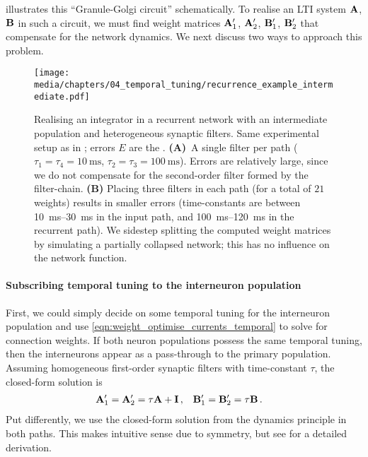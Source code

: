  illustrates this \enquote{Granule-Golgi circuit} schematically.
To realise an LTI system $\mathbf{A}$, $\mathbf{B}$ in such a circuit, we must find weight matrices $\mathbf{A}_1'$, $\mathbf{A}_2'$, $\mathbf{B}_1'$, $\mathbf{B}_2'$ that compensate for the network dynamics.
We next discuss two ways to approach this problem.

\begin{figure}
	\texttt{[image: media/chapters/04\_temporal\_tuning/recurrence\_example\_intermediate.pdf]}
	\caption[Realising an integrator in a recurrent network with an intermediate population]{Realising an integrator in a recurrent network with an intermediate population and heterogeneous synaptic filters. Same experimental setup as in ; errors $E$ are the \NRMSE.
	\textbf{(A)}~A single filter per path ($\tau_1 = \tau_4 = \SI{10}{\milli\second}$, $\tau_2 = \tau_3 = \SI{100}{\milli\second}$).
	Errors are relatively large, since we do not compensate for the second-order filter formed by the filter-chain.
	\textbf{(B)} Placing three filters in each path (for a total of $21$ weights) results in smaller errors (time-constants are between \SIrange{10}{30}{\milli\second} in the input path, and \SIrange{100}{120}{\milli\second} in the recurrent path).
	We sidestep splitting the computed weight matrices by simulating a partially collapsed network; this has no influence on the network function.
	}
	\label{fig:recurrence_example_intermediate}
\end{figure}

\paragraph{Subscribing temporal tuning to the interneuron population}
First, we could simply decide on some temporal tuning for the interneuron population and use \cref{eqn:weight_optimise_currents_temporal} to solve for connection weights.
If both neuron populations possess the same temporal tuning, then the interneurons appear as a pass-through to the primary population.
Assuming homogeneous first-order synaptic filters with time-constant $\tau$, the closed-form solution is
\begin{align}
	\mathbf{A}_1' &= \mathbf{A}_2' = \tau \mathbf{A} + \mathbf{I} \,, & \mathbf{B}_1' &= \mathbf{B}_2' = \tau \mathbf{B} \,.
\end{align}
Put differently, we use the closed-form solution from the \NEF dynamics principle in both paths.
This makes intuitive sense due to symmetry, but see  for a detailed derivation.


